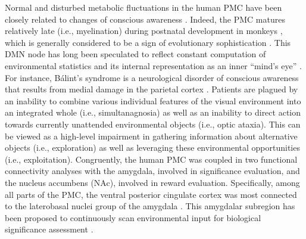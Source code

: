 \documentclass[10pt,letterpaper]{article}
\begin{document}
Normal and disturbed metabolic fluctuations in the
human PMC have been closely related to
changes of conscious awareness \citep{cavanna2006precuneus}.
Indeed,
the PMC matures relatively late (i.e., myelination) during postnatal development in monkeys
\citep{goldman1987development}, which is generally considered to
be a sign of evolutionary sophistication \citep{flechsig1920}.
%
This DMN node has long been speculated to
reflect constant computation of
environmental statistics and its internal representation
as an inner ``mind's eye'' \citep{cavanna2006precuneus, leech_pcc2014}.
For instance, B\'alint's syndrome is a neurological disorder of conscious
awareness that results from medial damage in the parietal cortex
\citep{balint1909seelenlahmung}.
Patients are plagued by an
inability to combine various individual features of the visual
environment into an integrated whole (i.e., simultanagnosia)
as well as an inability to direct action towards
currently unattended environmental objects
(i.e., optic ataxia).
This can be viewed as a high-level impairment in gathering
information about alternative objects (i.e., exploration) as well as
leveraging these environmental opportunities (i.e., exploitation).
Congruently,
the human PMC was coupled in two functional connectivity analyses
\citep{bzdok2015subspecialization}
with the amygdala, involved in significance evaluation, and
the nucleus accumbens (NAc), involved in reward evaluation.
Specifically, among all parts of the PMC,
the ventral posterior cingulate cortex was
most connected to the laterobasal
nuclei group of the amygdala
\citep{bzdok2015subspecialization}.
This amygdalar subregion has been proposed to
continuously scan environmental input
for biological significance assessment
\citep{amygdala_bzdok}.
\end{document}
